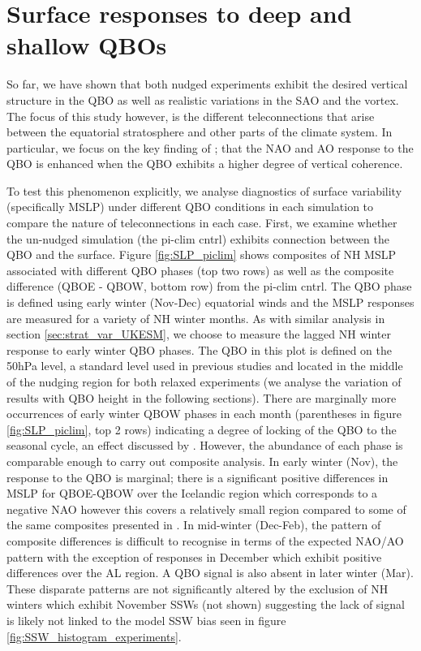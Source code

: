 \newpage

\section{Surface responses to deep and shallow QBOs}
\label{sec:MSLP_responses}
So far, we have shown that both nudged experiments exhibit the desired vertical structure in the QBO as well as realistic variations in the SAO and the vortex. The focus of this study however, is the different teleconnections that arise between the equatorial stratosphere and other parts of the climate system. In particular, we focus on the key finding of \cite{andrewsObserved2019d}; that the NAO and AO response to the QBO is enhanced when the QBO exhibits a higher degree of vertical coherence. 

To test this phenomenon explicitly, we analyse  diagnostics of surface variability (specifically MSLP) under different QBO conditions in each simulation to compare the nature of teleconnections in each case. First, we examine whether the un-nudged simulation (the pi-clim cntrl) exhibits connection between the QBO and the surface. Figure \ref{fig:SLP_piclim} shows composites of NH MSLP associated with different QBO phases (top two rows) as well as the composite difference (QBOE - QBOW, bottom row) from the pi-clim cntrl. The QBO phase is defined using early winter (Nov-Dec) equatorial winds and the MSLP responses are measured for a variety of NH winter months. As with similar analysis in section \ref{sec:strat_var_UKESM}, we choose to measure the lagged NH winter response to early winter QBO phases. The QBO in this plot is defined on the 50hPa level, a standard level used in previous studies \citep{ansteyHighlatitude2014b} and located in the middle of the nudging region for both relaxed experiments (we analyse the variation of results with QBO height in the following sections). There are marginally more occurrences of early winter QBOW phases in each month (parentheses in figure \ref{fig:SLP_piclim}, top 2 rows) indicating a degree of locking of the QBO to the seasonal cycle, an effect discussed by \cite{rajendranSynchronisation2016b}. However, the abundance of each phase is comparable enough to carry out composite analysis. In early winter (Nov), the response to the QBO is marginal; there is a significant positive differences in MSLP for QBOE-QBOW over the Icelandic region which corresponds to a negative NAO however this covers a relatively small region compared to some of the same composites presented in \cite{andrewsObserved2019d}. In mid-winter (Dec-Feb), the pattern of composite differences is difficult to recognise in terms of the expected NAO/AO pattern with the exception of responses in December which exhibit positive differences over the AL region. A QBO signal is also absent in later winter (Mar). These disparate patterns are not significantly altered by the exclusion of NH winters which exhibit November SSWs (not shown) suggesting the lack of signal is likely not linked to the model SSW bias seen in figure \ref{fig:SSW_histogram_experiments}. 

